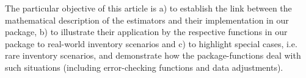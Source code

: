 \documentclass[article]{jss}
\begin{document}
The particular objective of this article is a) to establish the link between the mathematical description of the estimators and their implementation in our package, b) to illustrate their application by the respective functions in our package to real-world inventory scenarios and c) to highlight special cases, i.e. rare inventory scenarios, and demonstrate how the package-functions deal with such situations (including error-checking functions and data adjustments).







\end{document}
